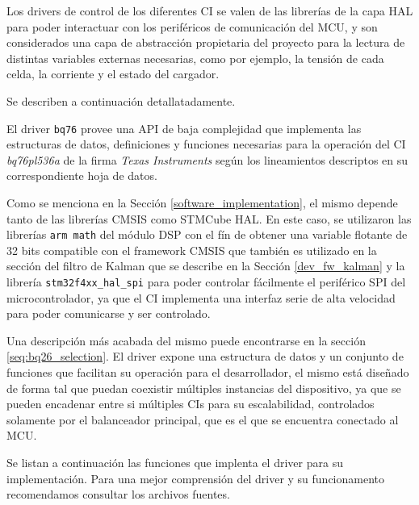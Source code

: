 \documentclass[10pt, a4paper]{article}
\newcounter{subsubsubsection}[subsubsection]
\begin{document}
Los drivers de control de los diferentes \acrshort{CI} se valen de las librerías 
de la capa \acrshort{HAL} para poder interactuar con los periféricos de
comunicación del \acrshort{MCU}, y son considerados una capa de abstracci\'on
propietaria del proyecto para la lectura de distintas variables externas
necesarias, como por ejemplo, la tensi\'on de cada celda, la corriente y el
estado del cargador.

Se describen a continuación detallatadamente.


El driver \texttt{bq76} provee una \acrshort{API} de baja complejidad que
implementa las estructuras de datos, definiciones y funciones necesarias para la
operación del \acrshort{CI} \emph{bq76pl536a} de la firma \emph{Texas
Instruments} según los lineamientos descriptos en su correspondiente hoja de
datos. 

Como se menciona en la Secci\'on \ref{software_implementation}, el mismo
depende tanto de las librer\'ias \acrshort{CMSIS} como STMCube \acrshort{HAL}.
En este caso, se utilizaron las librer\'ias \texttt{arm math} del m\'odulo
\acrshort{DSP} con el fín de obtener una variable flotante de 32 bits compatible
con el framework \acrshort{CMSIS} que tambi\'en es utilizado en la secci\'on del
filtro de Kalman que se describe en la Secci\'on \ref{dev_fw_kalman} y la 
librería \texttt{stm32f4xx\_hal\_spi} para poder controlar f\'acilmente el 
periférico \acrshort{SPI} del microcontrolador, ya que el \acrshort{CI}
implementa una interfaz serie de alta velocidad para poder comunicarse y ser
controlado.

Una descripción más acabada del mismo puede encontrarse en la sección 
\ref{seq:bq26_selection}. El driver expone una estructura de datos y un conjunto
de funciones que facilitan su operaci\'on para el desarrollador, el mismo est\'a
diseñado de forma tal que puedan coexistir m\'ultiples instancias del
dispositivo, ya que se pueden encadenar entre si m\'ultiples \acrshort{CI}s para
su escalabilidad, controlados solamente por el balanceador principal, que es el
que se encuentra conectado al \acrshort{MCU}.

Se listan a continuación las funciones que implenta el driver para su
implementaci\'on. Para una mejor comprensión del driver y su funcionamento 
recomendamos consultar los archivos fuentes.
\end{document}
